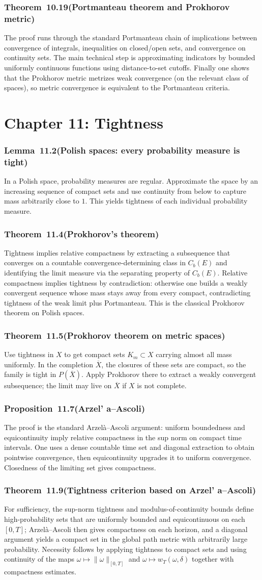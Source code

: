 \documentclass[11pt,a4paper]{article}
\newcommand{\proofcapsule}[4]{%
  \subsubsection*{#1~#2\quad \textnormal{\small(#3)}}%
  #4}
\begin{document}
\proofcapsule{Theorem}{10.19}{Portmanteau theorem and Prokhorov metric}{The proof runs through the standard Portmanteau chain of implications between convergence of integrals, inequalities on closed/open sets, and convergence on continuity sets. The main technical step is approximating indicators by bounded uniformly continuous functions using distance-to-set cutoffs. Finally one shows that the Prokhorov metric metrizes weak convergence (on the relevant class of spaces), so metric convergence is equivalent to the Portmanteau criteria.}
\section{Chapter 11: Tightness}
\proofcapsule{Lemma}{11.2}{Polish spaces: every probability measure is tight}{In a Polish space, probability measures are regular. Approximate the space by an increasing sequence of compact sets and use continuity from below to capture mass arbitrarily close to $1$. This yields tightness of each individual probability measure.}
\proofcapsule{Theorem}{11.4}{Prokhorov’s theorem}{Tightness implies relative compactness by extracting a subsequence that converges on a countable convergence-determining class in $C_b(E)$ and identifying the limit measure via the separating property of $C_b(E)$. Relative compactness implies tightness by contradiction: otherwise one builds a weakly convergent sequence whose mass stays away from every compact, contradicting tightness of the weak limit plus Portmanteau. This is the classical Prokhorov theorem on Polish spaces.}
\proofcapsule{Theorem}{11.5}{Prokhorov theorem on metric spaces}{Use tightness in $X$ to get compact sets $K_m\subset X$ carrying almost all mass uniformly. In the completion $\overline X$, the closures of these sets are compact, so the family is tight in $P(\overline X)$. Apply Prokhorov there to extract a weakly convergent subsequence; the limit may live on $\overline X$ if $X$ is not complete.}
\proofcapsule{Proposition}{11.7}{Arzel' a--Ascoli}{The proof is the standard Arzelà--Ascoli argument: uniform boundedness and equicontinuity imply relative compactness in the sup norm on compact time intervals. One uses a dense countable time set and diagonal extraction to obtain pointwise convergence, then equicontinuity upgrades it to uniform convergence. Closedness of the limiting set gives compactness.}
\proofcapsule{Theorem}{11.9}{Tightness criterion based on Arzel' a--Ascoli}{For sufficiency, the sup-norm tightness and modulus-of-continuity bounds define high-probability sets that are uniformly bounded and equicontinuous on each $[0,T]$; Arzelà--Ascoli then gives compactness on each horizon, and a diagonal argument yields a compact set in the global path metric with arbitrarily large probability. Necessity follows by applying tightness to compact sets and using continuity of the maps $\omega\mapsto \|\omega\|_{[0,T]}$ and $\omega\mapsto w_T(\omega,\delta)$ together with compactness estimates.}
\end{document}

